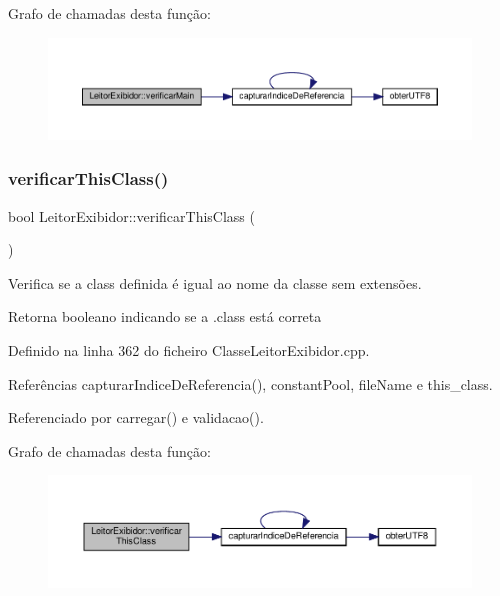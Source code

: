 Grafo de chamadas desta função\+:
\nopagebreak
\begin{figure}[H]
\begin{center}
\leavevmode
\includegraphics[width=350pt]{classLeitorExibidor_a2d486c9289a5d50a7fb00afffd2fa760_cgraph}
\end{center}
\end{figure}
\mbox{\label{classLeitorExibidor_a89d56b461514ed8fea8987ee52fa2eb9}} 
\subsubsection{\texorpdfstring{verificar\+This\+Class()}{verificarThisClass()}}
{\footnotesize\ttfamily bool Leitor\+Exibidor\+::verificar\+This\+Class (\begin{DoxyParamCaption}{ }\end{DoxyParamCaption})}



Verifica se a class definida é igual ao nome da classe sem extensões. 

\begin{DoxyReturn}{Retorna}
booleano indicando se a .class está correta 
\end{DoxyReturn}


Definido na linha 362 do ficheiro Classe\+Leitor\+Exibidor.\+cpp.



Referências capturar\+Indice\+De\+Referencia(), constant\+Pool, file\+Name e this\+\_\+class.



Referenciado por carregar() e validacao().

Grafo de chamadas desta função\+:
\nopagebreak
\begin{figure}[H]
\begin{center}
\leavevmode
\includegraphics[width=350pt]{classLeitorExibidor_a89d56b461514ed8fea8987ee52fa2eb9_cgraph}
\end{center}
\end{figure}


